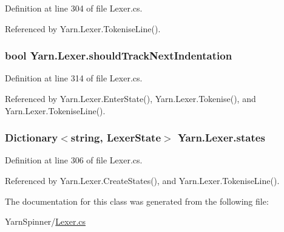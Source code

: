 Definition at line 304 of file Lexer.\-cs.



Referenced by Yarn.\-Lexer.\-Tokenise\-Line().

\hypertarget{a00121_ac670aac2245cbd4694dfbd5b69313218}{
\subsubsection[{should\-Track\-Next\-Indentation}]{\setlength{\rightskip}{0pt plus 5cm}bool Yarn.\-Lexer.\-should\-Track\-Next\-Indentation\hspace{0.3cm}{\ttfamily [private]}}}\label{a00121_ac670aac2245cbd4694dfbd5b69313218}


Definition at line 314 of file Lexer.\-cs.



Referenced by Yarn.\-Lexer.\-Enter\-State(), Yarn.\-Lexer.\-Tokenise(), and Yarn.\-Lexer.\-Tokenise\-Line().

\hypertarget{a00121_a2c65c0ba90f973e459583badefef216a}{
\subsubsection[{states}]{\setlength{\rightskip}{0pt plus 5cm}Dictionary$<$string, {\bf Lexer\-State}$>$ Yarn.\-Lexer.\-states\hspace{0.3cm}{\ttfamily [private]}}}\label{a00121_a2c65c0ba90f973e459583badefef216a}


Definition at line 306 of file Lexer.\-cs.



Referenced by Yarn.\-Lexer.\-Create\-States(), and Yarn.\-Lexer.\-Tokenise\-Line().



The documentation for this class was generated from the following file\-:\begin{DoxyCompactItemize}
\item 
Yarn\-Spinner/\hyperlink{a00298}{Lexer.\-cs}\end{DoxyCompactItemize}
